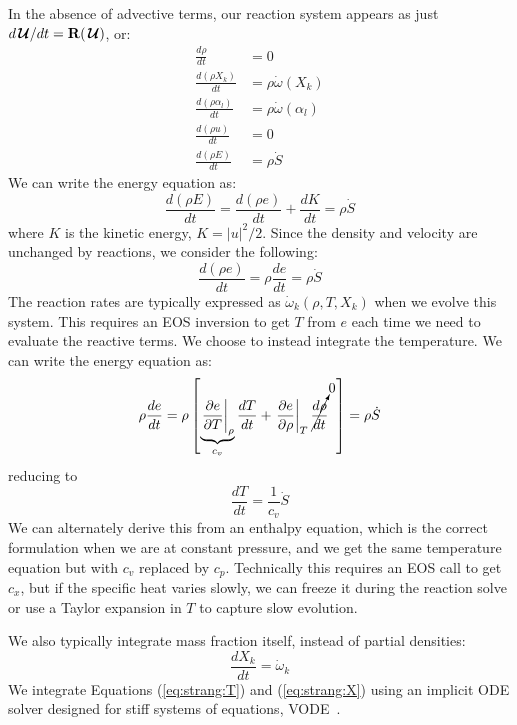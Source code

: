 \documentclass[times,modern]{aastex63}
\newcommand{\omegadot}{\dot{\omega}}
\newcommand{\Sdot}{\dot{S}}
\newcommand{\odt}[1]{{\frac{{d#1}}{dt}}}
\newcommand{\Uc}{{\,\bm{\mathcal{U}}}}
\newcommand{\Rb}{{\bf R}}
\begin{document}
In the absence of advective terms, our reaction system appears as just
$d\Uc/dt = \Rb(\Uc)$, or:
\begin{align}
\odt{\rho} & = 0 \\
\odt{(\rho X_k)} &= \rho \omegadot(X_k) \\
\odt{(\rho \alpha_l)} &= \rho \omegadot(\alpha_l) \\
\odt{(\rho u)} &= 0 \\
\odt{(\rho E)} &= \rho \Sdot
\end{align}
We can write the energy equation as:
\begin{equation}
\odt{(\rho E)} = \odt{(\rho e)} + \odt{K} = \rho \Sdot
\end{equation}
where $K$ is the kinetic energy, $K = |u|^2/2$.  Since the density and velocity
are unchanged by reactions, we consider the following:
\begin{equation}
\odt{(\rho e)} = \rho \odt{e} = \rho \Sdot
\end{equation}
The reaction rates are typically expressed as $\omegadot_k(\rho, T, X_k)$
when we evolve this system.  This requires an EOS inversion to get $T$ from $e$ each
time we need to evaluate the reactive terms.
We choose to instead integrate the temperature.
We can write the energy equation as:
\begin{equation}
\rho \odt{e} = \rho \left [ \underbrace{\left . \frac{\partial e}{\partial T} \right |_\rho}_{c_v}
                            \odt{T} +
                            \left . \frac{\partial e}{\partial \rho} \right |_T
                            \cancelto{0}{\odt{\rho}} \;\; \right ] = \rho \Sdot
\end{equation}
reducing to
\begin{equation}
\label{eq:strang:T}
\odt{T} = \frac{1}{c_v} \Sdot
\end{equation}
We can alternately derive this from an enthalpy equation, which is the
correct formulation when we are at constant pressure, and we get the
same temperature equation but with $c_v$ replaced by $c_p$.
Technically this requires an EOS call to get $c_x$, but if the
specific heat varies slowly, we can freeze it during the reaction
solve or use a Taylor expansion in $T$ to capture slow evolution.

We also typically integrate mass fraction itself, instead of partial
densities:
\begin{equation}
\label{eq:strang:X}
\odt{X_k} = \omegadot_k
\end{equation}
We integrate Equations (\ref{eq:strang:T}) and (\ref{eq:strang:X}) using
an implicit ODE solver designed for stiff systems of
equations, VODE~\citep{vode}.
\end{document}
